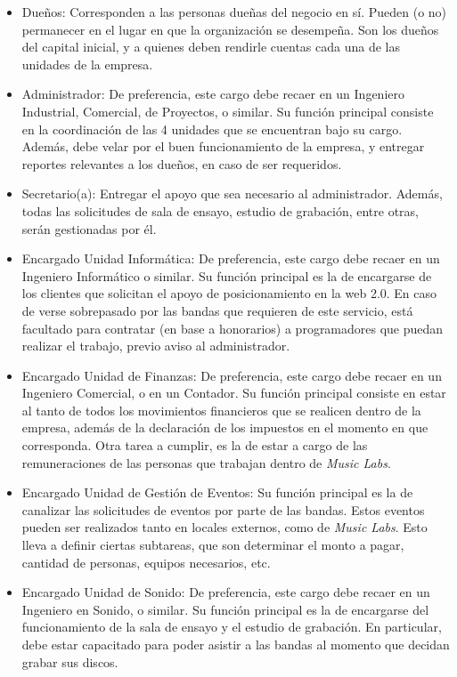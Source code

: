 \begin{itemize}

	\item Dueños: Corresponden a las personas dueñas del negocio en sí. Pueden (o no)
	permanecer en el lugar en que la organización se desempeña. Son los dueños del capital
	inicial, y a quienes deben rendirle cuentas cada una de las unidades de la empresa.

	\item Administrador: De preferencia, este cargo debe recaer en un
	 Ingeniero Industrial, Comercial, de Proyectos, o similar. Su función principal
	consiste en la coordinación de las 4 unidades que se encuentran bajo su cargo. Además, debe 
	velar por el buen funcionamiento de la empresa, y entregar reportes relevantes a los dueños, 
	en caso de ser requeridos. 
	
	\item Secretario(a): Entregar el apoyo que sea necesario al administrador. Además, todas 
	las solicitudes de sala de ensayo, estudio de grabación, entre otras, serán gestionadas por él.

	\item Encargado Unidad Informática: De preferencia, este cargo debe recaer en un 
	Ingeniero Informático o similar. Su función principal es la de encargarse de los clientes
	que solicitan el apoyo de posicionamiento en la web 2.0. En caso de verse sobrepasado por 
	las bandas que requieren de este servicio, está facultado para contratar (en base a 
	honorarios) a programadores que puedan realizar el trabajo, previo aviso al administrador.

	\item Encargado Unidad de Finanzas: De preferencia, este cargo debe recaer en un Ingeniero
	Comercial, o en un Contador. Su función principal consiste en estar al tanto de todos los 
	movimientos financieros que se realicen dentro de la empresa, además de la declaración de 
	los impuestos en el momento en que corresponda. Otra tarea a cumplir, es la de estar
	a cargo de las remuneraciones de las personas que trabajan dentro de \emph{Music Labs}.

	\item Encargado Unidad de Gestión de Eventos: Su función principal es la de canalizar 
	las solicitudes de eventos por parte de las bandas. Estos eventos pueden ser realizados 
	tanto en locales externos, como de \emph{Music Labs}. Esto lleva a definir ciertas subtareas, 
	que son determinar el monto a pagar, cantidad de personas, equipos necesarios, etc.

	\item Encargado Unidad de Sonido: De preferencia, este cargo debe recaer en un Ingeniero 
	en Sonido, o similar. Su función principal es la de encargarse del funcionamiento de la
	sala de ensayo y el estudio de grabación. En particular, debe estar capacitado para poder
	asistir a las bandas al momento que decidan grabar sus discos. 

\end{itemize}

